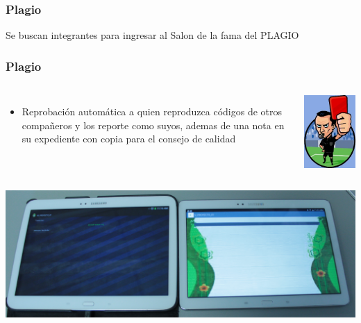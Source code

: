 
\begin{frame}
\frametitle{Plagio}
\Huge
\begin{center}
Se buscan integrantes para ingresar al Salon de la fama del PLAGIO
\end{center}
\end{frame}

\begin{frame}
\frametitle{Plagio}

\begin{columns}[c] %
\begin{itemize}
\item Reprobación automática a quien reproduzca códigos de otros compañeros y los reporte como suyos, ademas de una nota en su expediente con copia para el consejo de calidad 
\end{itemize}
\begin{center}
\includegraphics[scale=0.27]{Plagio/tarjeta-roja.jpg}
\end{center}
\end{columns}
\begin{center}
\includegraphics[scale=0.23]{Plagio/Pirata01}
\end{center}
\end{frame}


